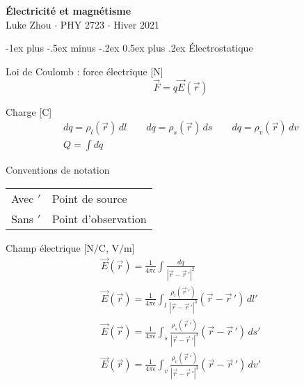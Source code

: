 \documentclass[10pt,landscape]{article}
\makeatletter
\renewcommand{\section}{\@startsection{section}{1}{0mm}%
                                {-1ex plus -.5ex minus -.2ex}%
                                {0.5ex plus .2ex}%
                                {\normalfont\large\bfseries}}
\newcommand{\extraline}{\vspace{1em}}
\newcommand{\halfline}{\vspace{0.5em}}
\newcommand{\tableindent}{\hspace{1.5em}}
\newcommand{\uvec}[1]{\ensuremath{{\hat{#1}}}}
\makeatother
\begin{document}
\raggedright
\footnotesize
\begin{multicols}{3}

\setlength{\premulticols}{1pt}
\setlength{\postmulticols}{1pt}
\setlength{\multicolsep}{1pt}
\setlength{\columnsep}{2pt}

\begin{center}
     \Large{\textbf{Électricité et magnétisme}} \\
     \small{Luke Zhou $\cdot$ PHY 2723 $\cdot$ Hiver 2021}
\end{center}

\section{Électrostatique}

Loi de Coulomb : force électrique [\si{\newton}]
 \[ \vec{F} = q\vec{E}(\vec{r}) \] %

Charge  [\si{\coulomb}]
\begin{gather*} 
dq = \rho_l(\vec{r}) \,dl  \qquad  dq = \rho_s(\vec{r}) \,ds  \qquad dq = \rho_v(\vec{r}) \,dv  \\
 \textstyle Q = \int dq 
\end{gather*}

Conventions de notation  \\
\halfline
\begin{tabular}{@{\tableindent}ll@{}}
	Avec $'$ & Point de source\\
	Sans $'$ & Point d'observation \\
\end{tabular}

\extraline
Champ électrique [$\si{\newton/\coulomb}$, $\si{\volt/\metre}$]
\begin{gather*}
\vec{E}(\vec{r}) = \frac{1}{4\pi\epsilon} \int \frac{dq}{| \vec{r} - \vec{r}\,' |^2 }  \\
%
 \vec{E}(\vec{r}) = \frac{1}{4\pi\epsilon} \int_{l} \frac{\rho_l(\vec{r}\,')}{| \vec{r} - \vec{r}\,' |^3 } (\vec{r} - \vec{r}\,' )\,dl'  \\
%
\vec{E}(\vec{r}) = \frac{1}{4\pi\epsilon} \int_{s} \frac{\rho_s(\vec{r}\,')}{| \vec{r} - \vec{r}\,'|^3 } (\vec{r} - \vec{r}\,' )\,ds' \\
%
\vec{E}(\vec{r}) = \frac{1}{4\pi\epsilon} \int_{v} \frac{\rho_v(\vec{r}\,')}{| \vec{r} - \vec{r}\,' |^3 } (\vec{r} - \vec{r}\,' )\,dv'  
\end{gather*}
	

\end{multicols}
\end{document}
